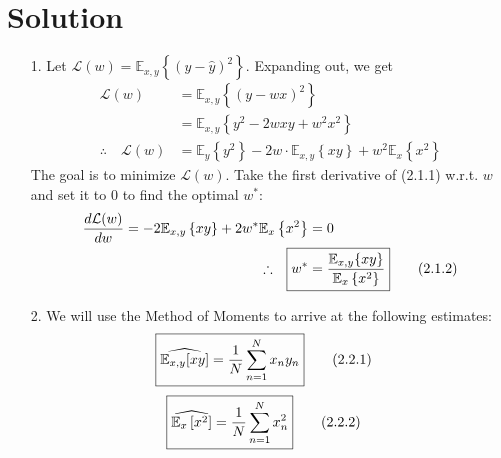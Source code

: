 \documentclass[submit]{../harvardml}
\newenvironment{solution}
  {\color{blue}\section*{Solution}}
{}
\begin{document}
\newpage
\begin{solution}

\begin{enumerate}
    \item [1.] Let $\mathcal{L}(w) = \mathbb{E}_{x,y}\left\{ \left(y-\hat{y}\right)^2\right\}$. Expanding out, we get
    \begin{align*}
        \mathcal{L}(w) &= \mathbb{E}_{x,y} \left\{ \left(y-wx\right)^2 \right\} \\
        &= \mathbb{E}_{x,y} \left\{ y^2 - 2wxy + w^2x^2 \right\} \\
        \therefore \quad \mathcal{L}(w) &= \mathbb{E}_y \left\{ y^2 \right\} - 2w \cdot \mathbb{E}_{x,y}\left\{ xy \right\} + w^2 \mathbb{E}_{x}\left\{ x^2\right\} \tag*{(2.1.1)}
    \end{align*}
    The goal is to minimize $\mathcal{L}(w)$. Take the first derivative of (2.1.1) w.r.t. $w$ and set it to 0 to find the optimal $w^*$:
    \begin{align*}
        \frac{d\mathcal{L}(w)}{dw} = -2\mathbb{E}_{x,y}\left\{xy\right\} + 2w^*\mathbb{E}_{x}\left\{x^2\right\} &= 0 \\
        \therefore \quad \Aboxed{ w^* &= \frac{\mathbb{E}_{x,y}\{xy\} }{\mathbb{E}_x\left\{x^2\right\} } } \tag*{(2.1.2)}
    \end{align*}

    \item[2.] We will use the Method of Moments to arrive at the following estimates:
    \begin{align*}
        \Aboxed{ \widehat{ \mathbb{E}_{x,y}[xy] } &= \frac{1}{N} \sum_{n=1}^N x_ny_n } \tag*{(2.2.1)}
    \end{align*}
    \begin{align*}
        \Aboxed{ \widehat{ \mathbb{E}_{x}\left[x^2\right] } &= \frac{1}{N} \sum_{n=1}^N x_n^2 } \tag*{(2.2.2)}
    \end{align*}


\end{enumerate}
\end{solution}
\end{document}
